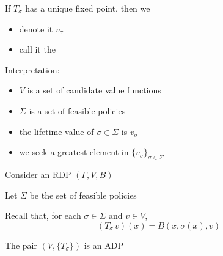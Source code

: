 \documentclass[dvipsnames]{beamer}
\begin{document}
\begin{frame}
    
    If $T_\sigma$ has a unique fixed point, then we
    \begin{itemize}
        \item denote it $v_\sigma$ 
            \vspace{0.5em}
        \item call it the 
    \end{itemize}

            \vspace{0.5em}
            \vspace{0.5em}
            \vspace{0.5em}

    Interpretation: 

    \begin{itemize}
        \item $V$ is a set of candidate value functions
            \vspace{0.5em}
        \item $\Sigma$ is a set of feasible policies
            \vspace{0.5em}
        \item the lifetime value of $\sigma \in \Sigma$ is $v_\sigma$
            \vspace{0.5em}
        \item we seek a greatest element in $\{v_\sigma\}_{\sigma \in \Sigma}$
    \end{itemize}


\end{frame}


\begin{frame}
    
    \Eg  Consider an RDP $(\Gamma, V, B)$
            \vspace{0.5em}
            \vspace{0.5em}
            \vspace{0.5em}

    Let $\Sigma$ be the set of feasible policies

            \vspace{0.5em}
            \vspace{0.5em}
    Recall that, for each $\sigma \in \Sigma$ and $v \in V$,
    \begin{equation*}
        (T_\sigma \, v)(x)
        = B(x, \sigma(x), v)
    \end{equation*}

            \vspace{0.5em}
            \vspace{0.5em}
            \vspace{0.5em}

    The pair $(V, \{T_\sigma\})$ is an ADP

\end{frame}
\end{document}
